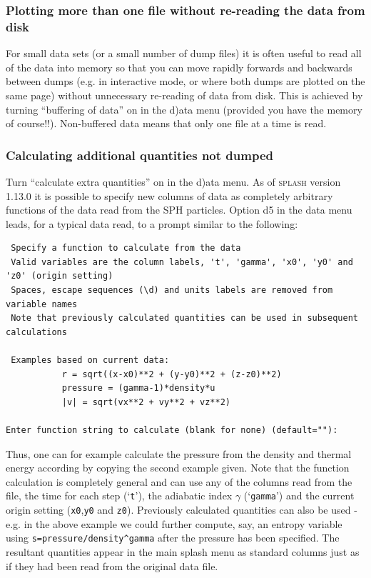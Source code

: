 \documentclass[a4paper,10pt]{article}
\newcommand{\splash}{\textsc{splash }}
\begin{document}
\subsubsection{ Plotting more than one file without re-reading the data from disk}
\label{sec:buffering}
 For small data sets (or a small number of dump files) it is often useful to read all of the data into memory so that you can move rapidly forwards and backwards between dumps (e.g. in interactive mode, or where both dumps are plotted on the same page) without unnecessary re-reading of data from disk. This is achieved by turning ``buffering of data'' on in the d)ata menu (provided you have the memory of course!!). Non-buffered data means that only one file at a time is read.

\subsubsection{ Calculating additional quantities not dumped}
Turn ``calculate extra quantities'' on in the d)ata menu. As of \splash version 1.13.0 it is possible to specify new columns of data as completely arbitrary functions of the data read from the SPH particles. Option d5 in the data menu leads, for a typical data read, to a prompt similar to the following:

\begin{verbatim}
 Specify a function to calculate from the data 
 Valid variables are the column labels, 't', 'gamma', 'x0', 'y0' and 'z0' (origin setting) 
 Spaces, escape sequences (\d) and units labels are removed from variable names
 Note that previously calculated quantities can be used in subsequent calculations

 Examples based on current data: 
           r = sqrt((x-x0)**2 + (y-y0)**2 + (z-z0)**2)
           pressure = (gamma-1)*density*u
           |v| = sqrt(vx**2 + vy**2 + vz**2)
           
Enter function string to calculate (blank for none) (default=""):
\end{verbatim}

Thus, one can for example calculate the pressure from the density and thermal energy according by copying the second example given. Note that the function calculation is completely general and can use any of the columns read from the file, the time for each step (`\verb+t+'), the adiabatic index $\gamma$ (`\verb+gamma+') and the current origin setting (\verb+x0+,\verb+y0+ and \verb+z0+). Previously calculated quantities can also be used - e.g. in the above example we could further compute, say, an entropy variable using \verb+s=pressure/density^gamma+ after the pressure has been specified. The resultant quantities appear in the main splash menu as standard columns just as if they had been read from the original data file.
\end{document}
